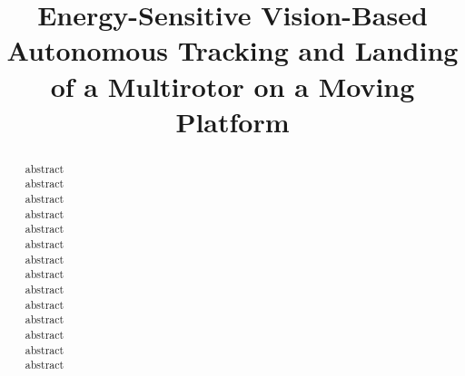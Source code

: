 \documentclass[conference]{IEEEtran}
\begin{document}


\title{Energy-Sensitive Vision-Based Autonomous Tracking and Landing of a Multirotor on a Moving Platform} %

\author{
}

\maketitle


\begin{abstract}

abstract\\
abstract\\
abstract\\
abstract\\
abstract\\
abstract\\
abstract\\
abstract\\
abstract\\
abstract\\
abstract\\
abstract\\
abstract\\
abstract

\end{abstract}
\end{document}
